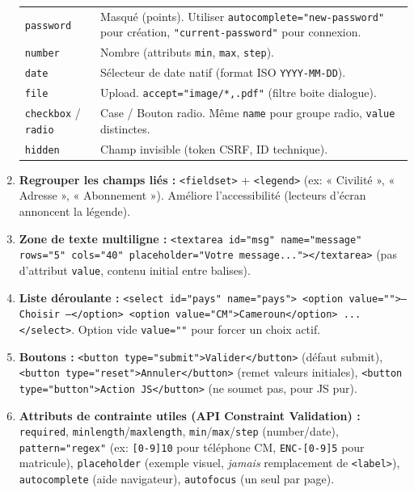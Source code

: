 \documentclass[11pt]{article}
\begin{document}
\begin{methode}
\begin{enumerate}
\begin{tabularx}{\linewidth}{@{}lX@{}}
                  \texttt{password} & Masqué (points). Utiliser \texttt{autocomplete="new-password"} pour création, \texttt{"current-password"} pour connexion. \\
                  \texttt{number} & Nombre (attributs \texttt{min}, \texttt{max}, \texttt{step}). \\
                  \texttt{date} & Sélecteur de date natif (format ISO \texttt{YYYY-MM-DD}). \\
                  \texttt{file} & Upload. \texttt{accept="image/*,.pdf"} (filtre boite dialogue). \\
                  \texttt{checkbox} / \texttt{radio} & Case / Bouton radio. Même \texttt{name} pour groupe radio, \texttt{value} distinctes. \\
                  \texttt{hidden} & Champ invisible (token CSRF, ID technique).
              \end{tabularx}
        \item \textbf{Regrouper les champs liés :} \texttt{<fieldset>} + \texttt{<legend>} (ex: « Civilité », « Adresse », « Abonnement »). Améliore l'accessibilité (lecteurs d'écran annoncent la légende).
        \item \textbf{Zone de texte multiligne :} \texttt{<textarea id="msg" name="message" rows="5" cols="40" placeholder="Votre message..."></textarea>} (pas d'attribut \texttt{value}, contenu initial entre balises).
        \item \textbf{Liste déroulante :} \texttt{<select id="pays" name="pays"> <option value="">-- Choisir --</option> <option value="CM">Cameroun</option> ... </select>}. Option vide \texttt{value=""} pour forcer un choix actif.
        \item \textbf{Boutons :} \texttt{<button type="submit">Valider</button>} (défaut submit), \texttt{<button type="reset">Annuler</button>} (remet valeurs initiales), \texttt{<button type="button">Action JS</button>} (ne soumet pas, pour JS pur).
        \item \textbf{Attributs de contrainte utiles (API Constraint Validation) :}
              \texttt{required}, \texttt{minlength}/\texttt{maxlength}, \texttt{min}/\texttt{max}/\texttt{step} (number/date), \texttt{pattern="regex"} (ex: \texttt{[0-9]{10}} pour téléphone CM, \texttt{ENC-[0-9]{5}} pour matricule), \texttt{placeholder} (exemple visuel, \emph{jamais} remplacement de \texttt{<label>}), \texttt{autocomplete} (aide navigateur), \texttt{autofocus} (un seul par page).
    \end{enumerate}
\end{methode}
\end{document}
